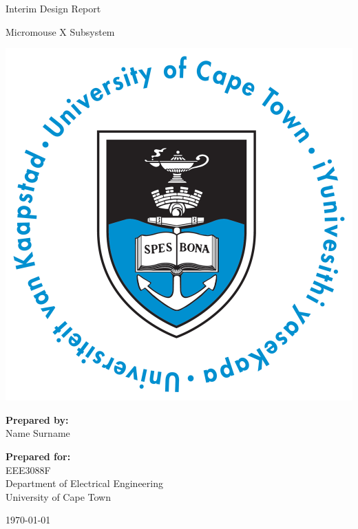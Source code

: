 \thispagestyle{empty}
\begin{center}
    
\Huge

\vspace{5cm}

Interim Design Report

\vspace{0.1cm}
\large
Micromouse X Subsystem

\vspace{2cm}
\includegraphics[width=0.6\linewidth]{FrontMatter/UCT_logo.png}

\vfill

\large
\textbf{Prepared by:}\\
Name Surname

\vspace{1cm}

\textbf{Prepared for:}\\
EEE3088F\\
Department of Electrical Engineering\\
University of Cape Town

\vspace{2cm}

\today


\end{center}